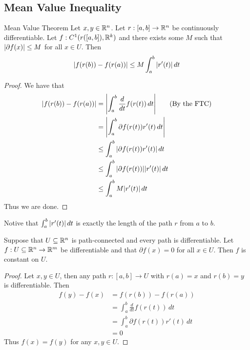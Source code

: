 \documentclass[a4paper]{article}
\begin{document}
\subsection{Mean Value Inequality}
\begin{thm}{Mean Value Theorem}{} Let $x,y\in\mathbb{R}^n$. Let $r:[a,b]\to\mathbb{R}^n$ be continuously differentiable. Let $f: C^1(r([a,b]),\mathbb{R}^k)$ and there exists some $M$ such that $\abs{\partial f(x)}\leq M$ for all $x\in U$. Then $$\abs{f(r(b))-f(r(a))}\leq M\int_a^b\abs{r'(t)}\,dt$$ 
\begin{proof}
We have that 
\begin{align*}
\abs{f(r(b))-f(r(a))}&=\abs{\int_a^b\frac{d}{dt}f(r(t))\,dt}\tag{By the FTC}\\
&=\abs{\int_a^b\partial f(r(t))r'(t)\,dt}\\
&\leq\int_a^b\abs{\partial f(r(t))r'(t)}\,dt\\
&\leq\int_a^b\abs{\partial f(r(t))}\abs{r'(t)}\,dt\\
&\leq\int_a^bM\abs{r'(t)}\,dt
\end{align*}
Thus we are done. 
\end{proof}
\end{thm}

Notive that $\int_a^b\abs{r'(t)}\,dt$ is exactly the length of the path $r$ from $a$ to $b$. 

\begin{prp}{}{} Suppose that $U\subseteq\mathbb{R}^n$ is path-connected and every path is differentiable. Let $f:U\subseteq\mathbb{R}^n\to\mathbb{R}^m$ be differentiable and that $\partial f(x)=0$ for all $x\in U$. Then $f$ is constant on $U$. 
\begin{proof}
Let $x,y\in U$, then any path $r:[a,b]\to U$ with $r(a)=x$ and $r(b)=y$ is differentiable. Then 
\begin{align*}
f(y)-f(x)&=f(r(b))-f(r(a))\\
&=\int_a^b\frac{d}{dt}f(r(t))\,dt\tag{By the FTC}\\
&=\int_a^b\partial f(r(t))r'(t)\,dt\\
&=0
\end{align*}
Thus $f(x)=f(y)$ for any $x,y\in U$. 
\end{proof}
\end{prp}
\end{document}
